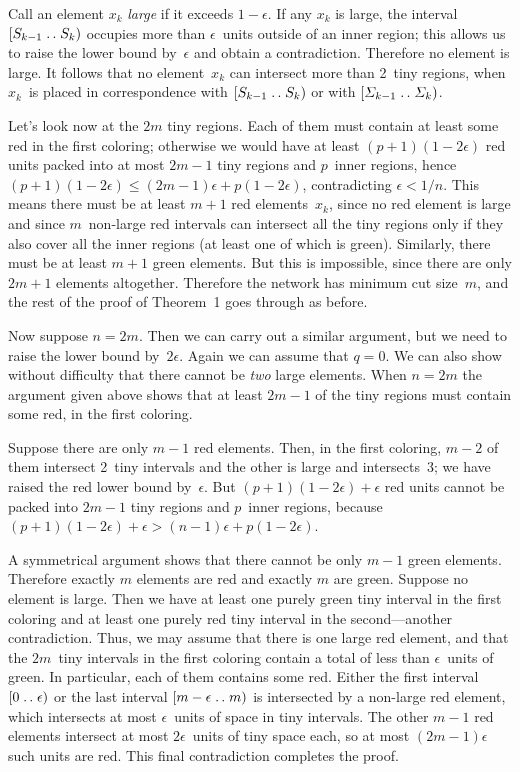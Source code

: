 Call an element $x_k$ {\it large\/} if it exceeds $1-\epsilon$. If any $x_k$ is
large, the interval $[S_{k-1}\mathrel{.\,.} S_k)$ occupies more than $\epsilon$~units
outside of an inner region; this allows us to raise the lower bound
by~$\epsilon$ and obtain a contradiction. Therefore no element is large. It
follows that no element~$x_k$ can intersect more than 2~tiny regions, 
when $x_k$~is
placed in correspondence with $[S_{k-1}\mathrel{.\,.} S_k)$ or with 
 $[{\mit\Sigma}_{k-1}\mathrel{.\,.} {\mit\Sigma}_k)$.

Let's look now at the $2m$ tiny regions. Each of them must contain at least
some red in the first coloring; otherwise we would have at least
$(p+1)(1-2\epsilon)$ red units packed into at most $2m-1$ tiny regions and
$p$~inner regions, hence $(p+1)(1-2\epsilon)\leq (2m-1)\epsilon
+p(1-2\epsilon)$, contradicting $\epsilon< 1/n$. This means there must be at
least $m+1$ red elements~$x_k$, since no red element is large and since
$m$~non-large red intervals can intersect all the tiny regions only if they
also cover all the inner regions (at least one of which is green).
Similarly, there must be at least $m+1$ green
elements. But this is impossible, since there are only $2m+1$ elements
altogether. Therefore the network has minimum cut size~$m$, and the rest of the
proof of Theorem~1 goes through as before.

Now suppose $n=2m$. Then we can carry out a similar argument, but we need to
raise the lower bound by~$2\epsilon$. Again we can assume that $q=0$. We can
also show without difficulty that there cannot be {\it two\/} large elements.
When $n=2m$ the argument given above shows that at least $2m-1$ of the tiny
regions must contain some red, in the first coloring.

Suppose there are only $m-1$ red elements. Then, in the first coloring, $m-2$
of them intersect 2~tiny intervals and the other is large and intersects~3; we
have raised the red lower bound by~$\epsilon$. 
But $(p+1)(1-2\epsilon)+\epsilon$ red units cannot be packed into $2m-1$ tiny
regions and $p$~inner regions, because $(p+1)(1-2\epsilon)+\epsilon >
(n-1)\epsilon +p(1-2\epsilon)$. 

A symmetrical argument shows that there cannot be only $m-1$ green elements.
Therefore exactly $m$ elements are red and exactly $m$ are green. Suppose no
element is large. Then we have at least one purely green tiny interval in the
first coloring and at least one purely red tiny interval in the
second---another contradiction. Thus, we may assume that there is one large red
element, and that the $2m$~tiny intervals in the first coloring 
contain a total of less than $\epsilon$~units of green. In particular, each of
them contains some red. Either the first interval $[0\mathrel{.\,.} \epsilon)$ or the
last interval $[m-\epsilon \mathrel{.\,.} m)$ is intersected by a non-large red element,
which intersects at most $\epsilon$~units of space in tiny intervals. The other
$m-1$ red elements intersect at most $2\epsilon$~units of tiny space each, so
at most $(2m-1)\epsilon$ such units are red. This final contradiction completes
the proof. \ \pfbox

